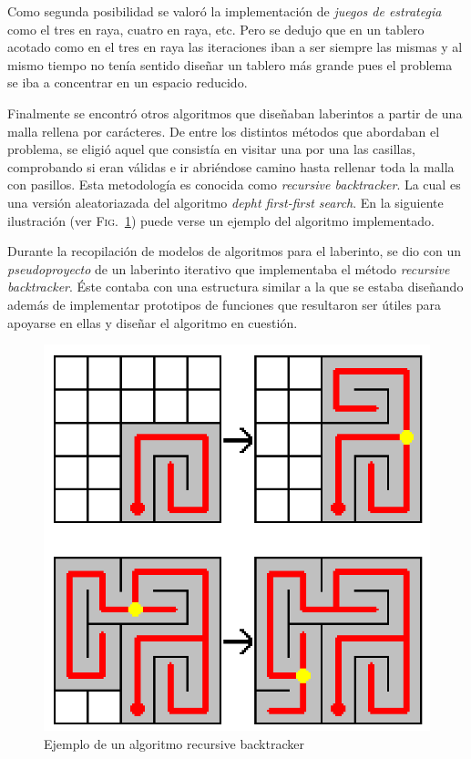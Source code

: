 \documentclass[12pt,a4paper]{article}
\begin{document}
Como segunda posibilidad se valoró la implementación de \textit{juegos de estrategia} como el tres en raya, cuatro en raya, etc. Pero se dedujo que en un tablero acotado como en el tres en raya las iteraciones iban a ser siempre las mismas y al mismo tiempo no tenía sentido diseñar un tablero más grande pues el problema se iba a concentrar en un espacio reducido.

\vspace{0.2cm}

Finalmente se encontró otros algoritmos que diseñaban laberintos a partir de una malla rellena por carácteres. De entre los distintos métodos que abordaban el problema, se eligió aquel que consistía en visitar una por una las casillas, comprobando si eran válidas e ir abriéndose camino hasta rellenar toda la malla con pasillos. Esta metodología es conocida como \textit{recursive backtracker}\cite{wiki}. La cual es una versión aleatoriazada del algoritmo \textit{depht first-first search}. En la siguiente ilustración (ver \textsc{Fig.}~\ref{back_tracker_label}) puede verse un ejemplo del algoritmo implementado.

\vspace{0.2cm}
Durante la recopilación de modelos de algoritmos para el laberinto, se dio con un \textit{pseudoproyecto} de un laberinto iterativo que implementaba el método \textit{recursive backtracker}. Éste contaba con una estructura similar a la que se estaba diseñando además de implementar prototipos de funciones que resultaron ser útiles para apoyarse en ellas y diseñar el algoritmo en cuestión. 

\begin{figure}[H]
	\centering
	\includegraphics[scale=0.4]{fotos/back_tracker.png}
	\caption{Ejemplo de un algoritmo recursive backtracker \cite{back_tracker}}
	\label{back_tracker_label}
\end{figure}
\end{document}
